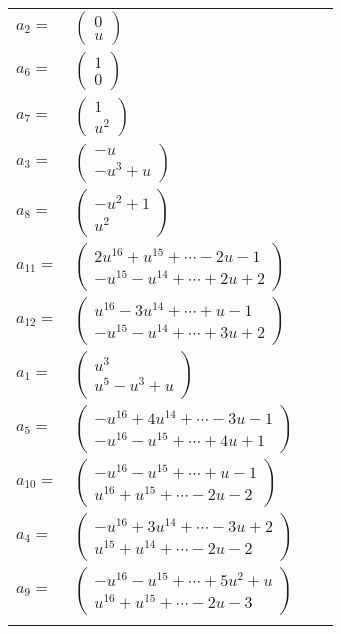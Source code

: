 \documentclass[1p]{elsarticle_modified}
\theoremstyle{definition}
\begin{document}
\begin{tabular}{m{7pt} m{180pt} m{7pt} m{180pt} }
\flushright $a_{2}=$&$\begin{pmatrix}0\\u\end{pmatrix}$ \\
\flushright $a_{6}=$&$\begin{pmatrix}1\\0\end{pmatrix}$ \\
\flushright $a_{7}=$&$\begin{pmatrix}1\\u^2\end{pmatrix}$ \\
\flushright $a_{3}=$&$\begin{pmatrix}- u\\- u^3+u\end{pmatrix}$ \\
\flushright $a_{8}=$&$\begin{pmatrix}- u^2+1\\u^2\end{pmatrix}$ \\
\flushright $a_{11}=$&$\begin{pmatrix}2 u^{16}+u^{15}+\cdots-2 u-1\\- u^{15}- u^{14}+\cdots+2 u+2\end{pmatrix}$ \\
\flushright $a_{12}=$&$\begin{pmatrix}u^{16}-3 u^{14}+\cdots+u-1\\- u^{15}- u^{14}+\cdots+3 u+2\end{pmatrix}$ \\
\flushright $a_{1}=$&$\begin{pmatrix}u^3\\u^5- u^3+u\end{pmatrix}$ \\
\flushright $a_{5}=$&$\begin{pmatrix}- u^{16}+4 u^{14}+\cdots-3 u-1\\- u^{16}- u^{15}+\cdots+4 u+1\end{pmatrix}$ \\
\flushright $a_{10}=$&$\begin{pmatrix}- u^{16}- u^{15}+\cdots+u-1\\u^{16}+u^{15}+\cdots-2 u-2\end{pmatrix}$ \\
\flushright $a_{4}=$&$\begin{pmatrix}- u^{16}+3 u^{14}+\cdots-3 u+2\\u^{15}+u^{14}+\cdots-2 u-2\end{pmatrix}$ \\
\flushright $a_{9}=$&$\begin{pmatrix}- u^{16}- u^{15}+\cdots+5 u^2+u\\u^{16}+u^{15}+\cdots-2 u-3\end{pmatrix}$\\&\end{tabular}
\end{document}
